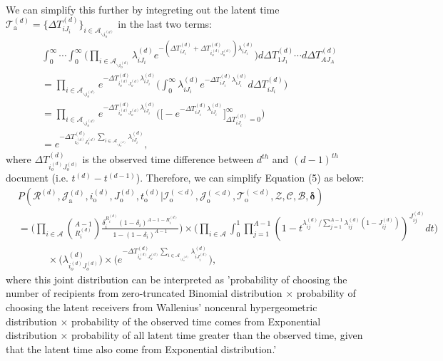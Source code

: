 \documentclass[a4paper]{article}
\begin{document}
\\ \newline
We can simplify this further by integreting out the latent time $\mathcal{T}^{(d)}_{\mbox{a}}=\{\Delta T^{(d)}_{iJ_i}\}_{i \in \mathcal{A}_{\backslash i_o^{(d)}}}$ in the last two terms:
\begin{equation}
	\begin{aligned}
		&\int_{0}^\infty\cdots\int_{0}^\infty \Big(\prod_{i\in \mathcal{A}_{\backslash i_o^{(d)}}} \lambda^{(d)}_{iJ_i}e^{-(\Delta T^{(d)}_{iJ_i} + \Delta T^{(d)}_{i_o^{(d)}J_o^{(d)}})\lambda^{(d)}_{iJ_i}} \Big)d\Delta T^{(d)}_{1J_1}\cdots d\Delta T^{(d)}_{AJ_A}\\&
		= \prod_{i\in \mathcal{A}_{\backslash i_o^{(d)}}} e^{- \Delta T^{(d)}_{i_o^{(d)}J_o^{(d)}}\lambda^{(d)}_{iJ_i}} \Big(\int_{0}^\infty \lambda^{(d)}_{iJ_i}e^{-\Delta T^{(d)}_{iJ_i} \lambda^{(d)}_{iJ_i}}  d\Delta T^{(d)}_{iJ_i}\Big)
		\\& =\prod_{i\in \mathcal{A}_{\backslash i_o^{(d)}}} e^{- \Delta T^{(d)}_{i_o^{(d)}J_o^{(d)}}\lambda^{(d)}_{iJ_i}} \Big(\Big [ - e^{-\Delta T^{(d)}_{iJ_i} \lambda^{(d)}_{iJ_i}}\Big]_{\Delta T^{(d)}_{iJ_i}  = 0} ^{\infty}\Big)
		\\& = e^{- \Delta T^{(d)}_{i_o^{(d)}J_o^{(d)}}\sum_{i\in \mathcal{A}_{\backslash i_o^{(d)}}}\lambda^{(d)}_{iJ_i}},
	\end{aligned}
\end{equation}
where $\Delta T^{(d)}_{i_o^{(d)}J_o^{(d)}}$ is the observed time difference between $d^{th}$ and $(d-1)^{th}$ document (i.e. $t^{(d)}-t^{(d-1)}$).
Therefore, we can simplify Equation (5) as below:
\begin{equation}
	\begin{aligned}
		&P(\mathcal{R}^{(d)},\mathcal{J}^{(d)}_{\mbox{a}}, i^{(d)}_{\mbox{o}}, J^{(d)}_{\mbox{o}}, t^{(d)}_{\mbox{o}} |\mathcal{I}^{(<d)}_{\mbox{o}}, \mathcal{J}^{(<d)}_{\mbox{o}}, \mathcal{T}^{(<d)}_{\mbox{o}}, \mathcal{Z}, \mathcal{C}, \mathcal{B}, \boldsymbol{\delta})\\&=\Big(\prod_{i\in \mathcal{A}} {{A-1}\choose R_i^{(d)}} \frac{\delta_i^{ R_i^{(d)}} (1-\delta_i)^{A-1-R_i^{(d)}}}{1 - (1-\delta_i)^{A-1}}\Big) \times \Big(\prod_{i\in \mathcal{A}}\int_0^1\prod_{j=1}^{A-1}(1-t^{\lambda_{ij}^{(d)} /  \sum_{j = 1}^{A-1} \lambda_{ij}^{(d)}(1-J_{ij}^{(d)})})^{J_{ij}^{(d)}}dt \Big)\\&\quad\quad\quad\times \Big(\lambda^{(d)}_{i_o^{(d)}J_{o}^{(d)}}\Big)\times  \Big(e^{-\Delta T^{(d)}_{i_o^{(d)}J_o^{(d)}}\sum\limits_{i\in \mathcal{A}_{\backslash i_o^{(d)}}}\lambda^{(d)}_{iJ^{(d)}_{i}}}\Big),
	\end{aligned}
\end{equation}
where this joint distribution can be interpreted as 'probability of choosing the number of recipients from zero-truncated Binomial distribution $\times$ probability of choosing the latent receivers from Wallenius' noncenral hypergeometric distribution $\times$ probability of the observed time comes from Exponential distribution $\times$ probability of all latent time greater than the observed time, given that the latent time also come from Exponential distribution.'
\end{document}
